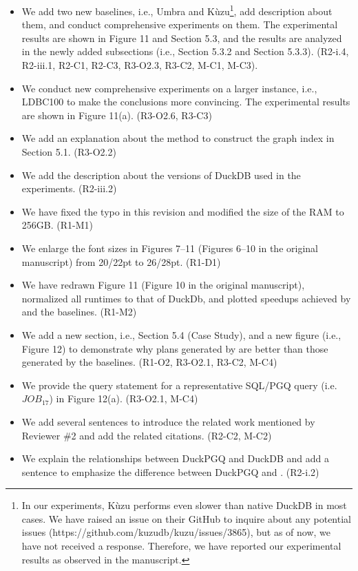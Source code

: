 \begin{itemize}
	\item We add two new baselines, i.e., Umbra and K\`uzu\footnote{In our experiments, K\`uzu performs even slower than native DuckDB in most cases. We have raised an issue on their GitHub to inquire about any potential issues (https://github.com/kuzudb/kuzu/issues/3865), but as of now, we have not received a response. Therefore, we have reported our experimental results as observed in the manuscript.}, add description about them, and conduct comprehensive experiments on them. The experimental results are shown in Figure 11 and Section 5.3, and the results are analyzed in the newly added subsections (i.e., Section 5.3.2 and Section 5.3.3). (R2-i.4, R2-iii.1, R2-C1, R2-C3, R3-O2.3, R3-C2, M-C1, M-C3).
	\item We conduct new comprehensive experiments on a larger instance, i.e., LDBC100 to make the conclusions more convincing. The experimental results are shown in Figure 11(a). (R3-O2.6, R3-C3)
	\item We add an explanation about the method to construct the graph index in Section 5.1. (R3-O2.2)
	\item We add the description about the versions of DuckDB used in the experiments. (R2-iii.2)
	\item We have fixed the typo in this revision and modified the size of the RAM to 256GB. (R1-M1)
	\item We enlarge the font sizes in Figures 7--11 (Figures 6--10 in the original manuscript) from 20/22pt to 26/28pt. (R1-D1)
	\item We have redrawn Figure 11 (Figure 10 in the original manuscript), normalized all runtimes to that of DuckDb, and plotted speedups achieved by \name and the baselines. (R1-M2)
	\item We add a new section, i.e., Section 5.4 (Case Study), and a new figure (i.e., Figure 12) to demonstrate why plans generated by \name are better than those generated by the baselines. (R1-O2, R3-O2.1, R3-C2, M-C4)
	\item We provide the query statement for a representative SQL/PGQ query (i.e. $JOB_{17}$) in Figure 12(a). (R3-O2.1, M-C4)
\end{itemize}

\begin{itemize}
	\item We add several sentences to introduce the related work mentioned by Reviewer \#2 and add the related citations. (R2-C2, M-C2)
	\item We explain the relationships between DuckPGQ and DuckDB and add a sentence to emphasize the difference between DuckPGQ and \name. (R2-i.2)
\end{itemize}

